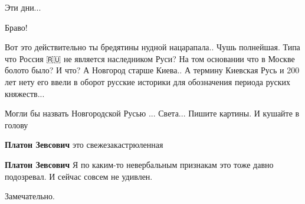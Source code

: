 \begin{itemize}
\begin{itemize}
Эти дни...
\end{itemize}

 
Браво!

 

Вот это действительно ты бредятины нудной нацарапала.. Чушь полнейшая. Типа что
Россия 🇷🇺 не является наследником Руси? На том основании что в Москве болото
было? И что? А Новгород старше Киева.. А термину Киевская Русь и 200 лет нету
его ввели в оборот русские историки для обозначения периода руских княжеств...

Могли бы назвать Новгородской Русью ... Света... Пишите картины. И кушайте в
голову
\begin{itemize}
 
\textbf{Платон Зевсович} это свежезакастрюленная🤣

 
\textbf{Платон Зевсович} Я по каким-то невербальным признакам это тоже давно подозревал. И сейчас совсем не удивлен.
\end{itemize}

 
Замечательно.

 

\end{itemize}
